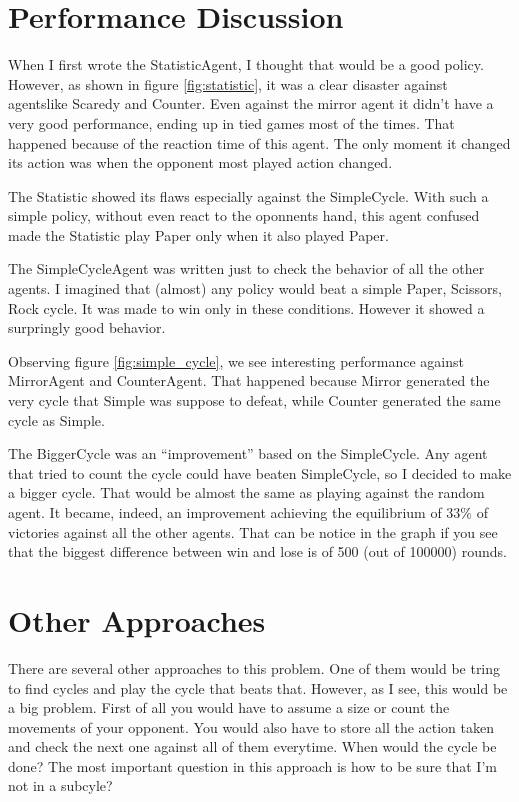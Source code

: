 \documentclass[12pt]{article}
\begin{document}
\section{Performance Discussion}

When I first wrote the StatisticAgent, I thought that would be a good policy.
However, as shown in figure \ref{fig:statistic}, it was a clear disaster against agentslike Scaredy and Counter. Even against the mirror agent it didn't have a very good performance, ending up in tied games most of the times. That happened because of the reaction time of this agent. The only moment it changed its action was when the opponent most played action changed.

The Statistic showed its flaws especially against the SimpleCycle. With such a simple policy, without even react to the oponnents hand, this agent confused made the Statistic play Paper only when it also played Paper.

The SimpleCycleAgent was written just to check the behavior of all the other agents. I imagined that (almost) any policy would beat a simple Paper, Scissors, Rock cycle. It was made to win only in these conditions. However it showed a surpringly good behavior.

Observing figure \ref{fig:simple_cycle}, we see interesting performance against MirrorAgent and CounterAgent. That happened because Mirror generated the very cycle that Simple was suppose to defeat, while Counter generated the same cycle as Simple.

The BiggerCycle was an ``improvement'' based on the SimpleCycle. Any agent that tried to count the cycle could have beaten SimpleCycle, so I decided to make a bigger cycle. That would be almost the same as playing against the random agent. It became, indeed, an improvement achieving the equilibrium of 33\% of victories against all the other agents. That can be notice in the graph if you see that the biggest difference between win and lose is of 500 (out of 100000) rounds.

\section{Other Approaches}

There are several other approaches to this problem. One of them would be tring to find cycles and play the cycle that beats that. However, as I see, this would be a big problem. First of all you would have to assume a size or count the movements of your opponent. You would also have to store all the action taken and check the next one against all of them everytime. When would the cycle be done? The most important question in this approach is how to be sure that I'm not in a subcyle?
\end{document}
